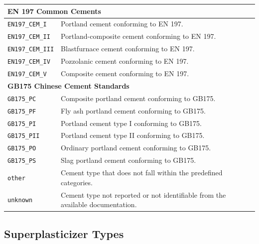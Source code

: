 \documentclass[11pt]{book}
\begin{document}
{\begin{longtable}{p{}p{}}
\hline
\multicolumn{2}{l}{\textbf{EN 197 Common Cements}}\\
\hline

\texttt{EN197\_CEM\_I} &
Portland cement conforming to EN 197. \\

\texttt{EN197\_CEM\_II} &
Portland-composite cement conforming to EN 197. \\

\texttt{EN197\_CEM\_III} &
Blastfurnace cement conforming to EN 197. \\

\texttt{EN197\_CEM\_IV} &
Pozzolanic cement conforming to EN 197. \\

\texttt{EN197\_CEM\_V} &
Composite cement conforming to EN 197. \\

\hline
\multicolumn{2}{l}{\textbf{GB175 Chinese Cement Standards}}\\
\hline

\texttt{GB175\_PC} &
Composite portland cement conforming to GB175. \\

\texttt{GB175\_PF} &
Fly ash portland cement conforming to GB175. \\

\texttt{GB175\_PI} &
Portland cement type I conforming to GB175. \\

\texttt{GB175\_PII} &
Portland cement type II conforming to GB175. \\

\texttt{GB175\_PO} &
Ordinary portland cement conforming to GB175. \\

\texttt{GB175\_PS} &
Slag portland cement conforming to GB175. \\

\hline

\texttt{other} &
Cement type that does not fall within the predefined categories. \\

\texttt{unknown} &
Cement type not reported or not identifiable from the available documentation. \\

\hline
\end{longtable}





\subsection{Superplasticizer Types}
\label{vocab:superplasticizer_type_list}

}
\end{document}
